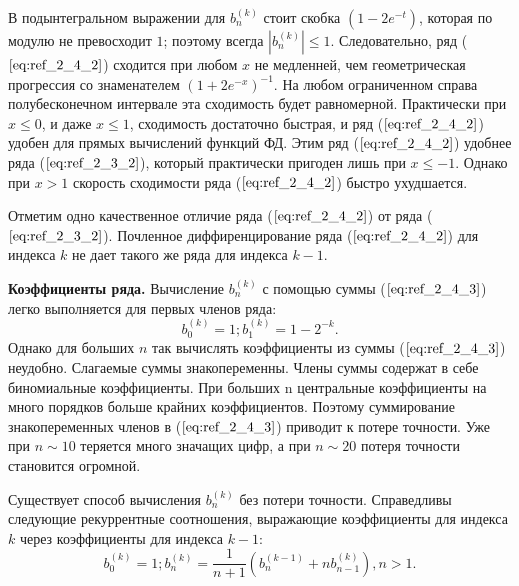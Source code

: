 В подынтегральном выражении для $b_n^{(k)}$ стоит скобка $(1-2e^{-t})$, которая по
модулю не превосходит $1$; поэтому всегда $|b_n^{(k)}| \leqslant 1$.
Следовательно, ряд ($\ref{eq:ref_2_4_2}$) сходится при любом $x$ не медленней, чем геометрическая прогрессия со знаменателем $(1+2e^{-x})^{-1}$. На любом ограниченном справа полубесконечном
интервале эта сходимость будет равномерной. Практически при $x \leqslant 0$, и даже
$x \leqslant 1$, сходимость достаточно быстрая, и ряд ($\ref{eq:ref_2_4_2}$) удобен для прямых вычислений
функций ФД. Этим ряд ($\ref{eq:ref_2_4_2}$) удобнее ряда ($\ref{eq:ref_2_3_2}$), который практически пригоден
лишь при $x \leqslant -1$. Однако при $x > 1$ скорость сходимости ряда ($\ref{eq:ref_2_4_2}$) быстро
ухудшается.

Отметим одно качественное отличие ряда ($\ref{eq:ref_2_4_2}$) от ряда ($\ref{eq:ref_2_3_2}$). Почленное
диффиренцирование ряда ($\ref{eq:ref_2_4_2}$) для индекса $k$ не дает такого же ряда для индекса
$k-1$.

\textbf{Коэффициенты ряда.} Вычисление $b_n^{(k)}$ с помощью суммы ($\ref{eq:ref_2_4_3}$) легко
выполняется для первых членов ряда:
\begin{equation}
b_0^{(k)}=1;b_1^{(k)}=1-2^{-k}.
\label{eq:ref_2_4_4}
\end{equation}
Однако для больших $n$ так вычислять коэффициенты из суммы ($\ref{eq:ref_2_4_3}$) неудобно.
Слагаемые суммы знакопеременны. Члены суммы содержат в себе
биномиальные коэффициенты. При больших n центральные коэффициенты на
много порядков больше крайних коэффициентов. Поэтому суммирование
знакопеременных членов в ($\ref{eq:ref_2_4_3}$) приводит к потере точности. Уже при $n \sim 10$
теряется много значащих цифр, а при $n \sim 20$ потеря точности становится
огромной.

Существует способ вычисления $b_n^{(k)}$ без потери точности. Справедливы
следующие рекуррентные соотношения, выражающие коэффициенты для
индекса $k$ через коэффициенты для индекса $k-1$:
\begin{equation}
b_0^{(k)}=1;b_n^{(k)}=\frac{1}{n+1}(b_n^{(k-1)}+nb_{n-1}^{(k)}),n>1.
\label{eq:ref_2_4_5}
\end{equation}

